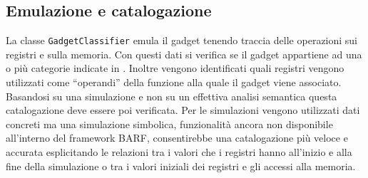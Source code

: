\subsection{Emulazione e catalogazione}
La classe \lstinline{GadgetClassifier} emula il gadget tenendo traccia
delle operazioni sui registri e sulla memoria. Con questi dati si
verifica se il gadget appartiene ad una o più categorie indicate in
\cite{schwartz-2011}. 
Inoltre vengono identificati quali registri vengono utilizzati come
``operandi'' della funzione alla quale il gadget viene
associato. Basandosi su una simulazione e non su un effettiva analisi
semantica questa catalogazione deve essere poi verificata. Per le
simulazioni vengono utilizzati dati concreti ma una simulazione
simbolica, funzionalità ancora non disponibile all'interno del
framework BARF, consentirebbe una catalogazione più veloce e
accurata esplicitando le relazioni tra i valori che i registri hanno
all'inizio e alla fine della simulazione o tra i valori iniziali dei
registri e gli accessi alla memoria.

